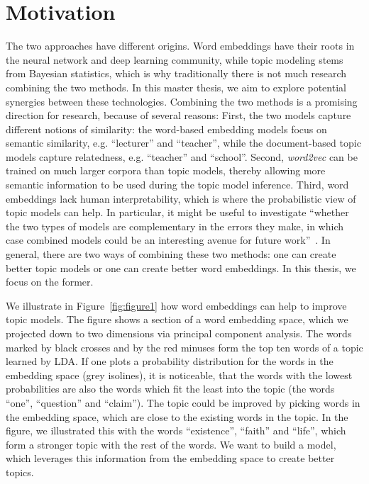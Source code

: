 \documentclass[
        a4paper,
        titlepage,
        twoside,
        parskip
        ]{scrbook}
\theoremstyle{break}
\begin{document}
\section{Motivation}
The two approaches have different origins.
Word embeddings have their roots in the neural network and deep learning community, while topic modeling stems from Bayesian statistics, which is why traditionally there is not much research combining the two methods.
In this master thesis, we aim to explore potential synergies between these technologies.
Combining the two methods is a promising direction for research, because of several reasons:
First, the two models capture different notions of similarity: the word-based embedding models focus on semantic similarity, e.g. ``lecturer'' and ``teacher'', while the document-based topic models capture relatedness, e.g. ``teacher'' and ``school''.
Second, \emph{word2vec} can be trained on much larger corpora than topic models, thereby allowing more semantic information to be used during the topic model inference.
Third, word embeddings lack human interpretability, which is where the probabilistic view of topic models can help.
In particular, it might be useful to investigate ``whether the two types of models are complementary in the errors they make, in which case combined models could be an interesting avenue for future work''~\cite{Baroni2014}.
In general, there are two ways of combining these two methods: one can create better topic models or one can create better word embeddings.
In this thesis, we focus on the former.

We illustrate in Figure~\ref{fig:figure1} how word embeddings can help to improve topic models.
The figure shows a section of a word embedding space, which we projected down to two dimensions via principal component analysis.
The words marked by black crosses and by the red minuses form the top ten words of a topic learned by LDA.
If one plots a probability distribution for the words in the embedding space (grey isolines), it is noticeable, that the words with the lowest probabilities are also the words which fit the least into the topic (the words ``one'', ``question'' and ``claim'').
The topic could be improved by picking words in the embedding space, which are close to the existing words in the topic.
In the figure, we illustrated this with the words ``existence'', ``faith'' and ``life'', which form a stronger topic with the rest of the words.
We want to build a model, which leverages this information from the embedding space to create better topics.
\end{document}
